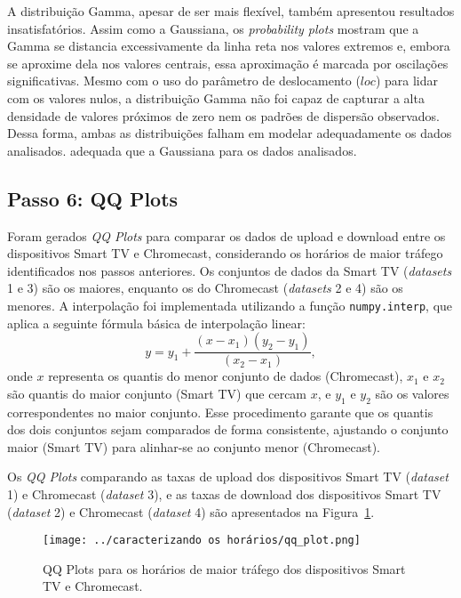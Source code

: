 A distribuição Gamma, apesar de ser mais flexível, também apresentou resultados insatisfatórios. Assim como a Gaussiana, os \textit{probability plots} mostram que a Gamma se distancia excessivamente da linha reta nos valores extremos e, embora se aproxime dela nos valores centrais, essa aproximação é marcada por oscilações significativas. Mesmo com o uso do parâmetro de deslocamento (\(loc\)) para lidar com os valores nulos, a distribuição Gamma não foi capaz de capturar a alta densidade de valores próximos de zero nem os padrões de dispersão observados. Dessa forma, ambas as distribuições falham em modelar adequadamente os dados analisados.
adequada que a Gaussiana para os dados analisados.

\subsection{Passo 6: QQ Plots}

Foram gerados \textit{QQ Plots} para comparar os dados de upload e download entre os dispositivos Smart TV e Chromecast, considerando os horários de maior tráfego identificados nos passos anteriores. Os conjuntos de dados da Smart TV (\textit{datasets} 1 e 3) são os maiores, enquanto os do Chromecast (\textit{datasets} 2 e 4) são os menores. A interpolação foi implementada utilizando a função \texttt{numpy.interp}, que aplica a seguinte fórmula básica de interpolação linear:
\[
y = y_1 + \frac{(x - x_1)(y_2 - y_1)}{(x_2 - x_1)},
\]
onde \(x\) representa os quantis do menor conjunto de dados (Chromecast), \(x_1\) e \(x_2\) são quantis do maior conjunto (Smart TV) que cercam \(x\), e \(y_1\) e \(y_2\) são os valores correspondentes no maior conjunto. Esse procedimento garante que os quantis dos dois conjuntos sejam comparados de forma consistente, ajustando o conjunto maior (Smart TV) para alinhar-se ao conjunto menor (Chromecast).

Os \textit{QQ Plots} comparando as taxas de upload dos dispositivos Smart TV (\textit{dataset} 1) e Chromecast (\textit{dataset} 3), e as taxas de download dos dispositivos Smart TV (\textit{dataset} 2) e Chromecast (\textit{dataset} 4) são apresentados na Figura~\ref{fig:qq_plot}.

\begin{figure}[H]
    \centering
    \texttt{[image: ../caracterizando os horários/qq\_plot.png]}
    \caption{QQ Plots para os horários de maior tráfego dos dispositivos Smart TV e Chromecast.}
    \label{fig:qq_plot}
\end{figure}

